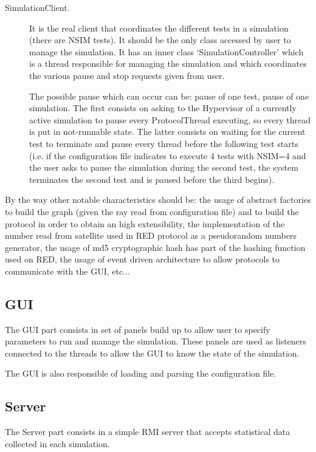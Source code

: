 \begin{description}
  \item[SimulationClient.] It is the real client that coordinates the different
  tests in a simulation (there are NSIM tests). It should be the only class accessed 
  by user to manage the simulation. It has an inner class 
  `SimulationController' which is a thread responsible for managing the 
  simulation and which coordinates the various pause and stop
  requests given from user.
  
  The possible pause which can occur can be: pause of one test, pause of one 
  simulation. The first consists on asking to the Hypervisor of a currently
  active simulation to pause every ProtocolThread executing, so every thread
  is put in not-runnable state. The latter consists on waiting for the 
  current test to terminate and pause every thread before the following test 
  starts (i.e. if the configuration file indicates to execute 4 tests with 
  NSIM=4 and the user asks to pause the simulation during the second test, the
  system terminates the second test and is paused before the third begins).
\end{description}

By the way other notable characteristics should be: the usage of abstract 
factories to build the graph (given the ray read from configuration file)
and to build the protocol in order to obtain an high extensibility, the 
implementation of the number read from satellite used in RED protocol
as a pseudorandom numbers generator, the usage of md5 cryptographic hash has 
part of the hashing function used on RED, the usage of event driven 
architecture to allow protocols to communicate with the GUI, etc...

\subsection{GUI}
The GUI part consists in set of panels build up to allow user to specify
parameters to run and manage the simulation. These panels are used as 
listeners connected to the threads to allow the GUI to know the state of
the simulation.

The GUI is also responsible of loading and parsing the configuration file.

\subsection{Server}
The Server part consists in a simple RMI server that accepts statistical data
collected in each simulation.

